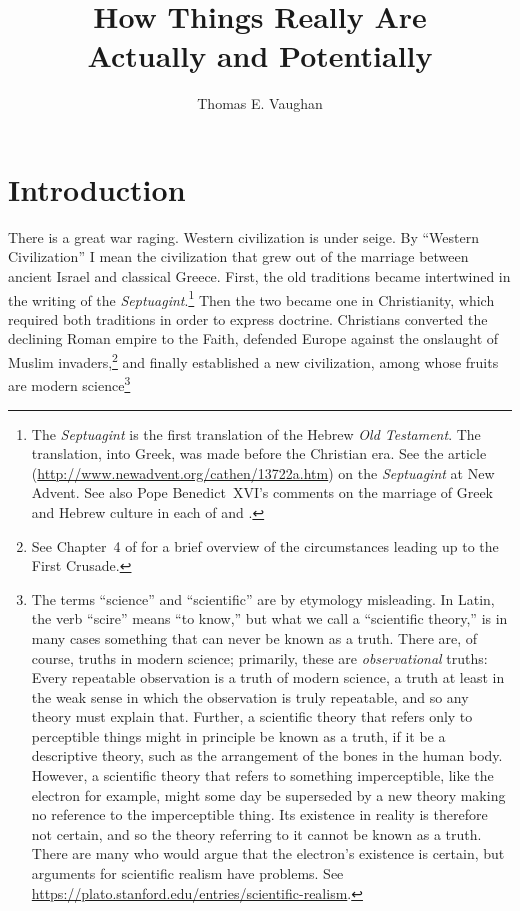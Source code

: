 \documentclass[twocolumn]{article}
\title{How Things Really Are\\{\Large Actually and Potentially}}
\author{Thomas E. Vaughan}
\begin{document}
\maketitle

\section{Introduction}

There is a great war raging.  Western civilization is under seige.  By
``Western Civilization'' I mean the civilization that grew out of the marriage
between ancient Israel and classical Greece.  First, the old traditions became
intertwined in the writing of the {\it Septuagint}.\footnote{%
   The {\it Septuagint} is the first translation of the Hebrew {\it Old
   Testament}.  The translation, into Greek, was made before the Christian era.
   See the article (\url{http://www.newadvent.org/cathen/13722a.htm}) on the
   {\it Septuagint} at New Advent.  See also Pope Benedict~XVI's comments on
   the marriage of Greek and Hebrew culture in each of \cite{r2005} and
   \cite{r2007}.
}
Then the two became one in Christianity, which required both traditions in
order to express doctrine. Christians converted the declining Roman empire to
the Faith, defended Europe against the onslaught of Muslim invaders,\footnote{%
   See Chapter~4 of \cite{b1938} for a brief overview of the circumstances
   leading up to the First Crusade.
}
and finally established a new civilization, among whose fruits are modern
science\footnote{%
   The terms ``science'' and ``scientific'' are by etymology misleading.  In
   Latin, the verb ``scire'' means ``to know,'' but what we call a ``scientific
   theory,'' is in many cases something that can never be known as a truth.
   There are, of course, truths in modern science; primarily, these are
   \emph{observational} truths: Every repeatable observation is a truth of
   modern science, a truth at least in the weak sense in which the observation
   is truly repeatable, and so any theory must explain that.  Further, a
   scientific theory that refers only to perceptible things might in principle
   be known as a truth, if it be a descriptive theory, such as the arrangement
   of the bones in the human body.  However, a scientific theory that refers to
   something imperceptible, like the electron for example, might some day be
   superseded by a new theory making no reference to the imperceptible thing.
   Its existence in reality is therefore not certain, and so the theory
   referring to it cannot be known as a truth.  There are many who would argue
   that the electron's existence is certain, but arguments for scientific
   realism have problems. See
   \url{https://plato.stanford.edu/entries/scientific-realism}.%
}
\end{document}
